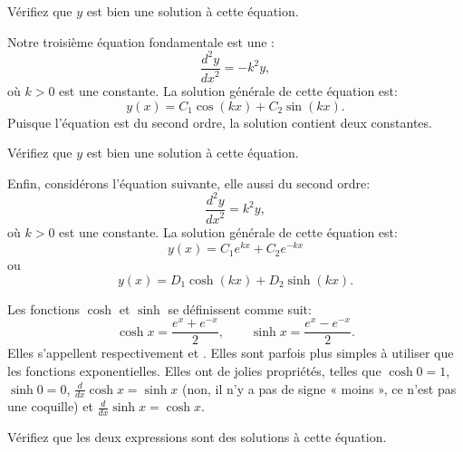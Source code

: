 \begin{exercise}
	Vérifiez que $y$ est bien une solution à cette équation.
\end{exercise}

Notre troisième équation fondamentale est une
\emph{}:
\begin{equation*}
	\frac{d^2y}{{dx}^2} = -k^2 y,
\end{equation*}
où $k > 0$ est une constante. La solution générale de cette équation est:
\begin{equation*}
	y(x) = C_1 \cos(kx) + C_2 \sin(kx).
\end{equation*}
Puisque l'équation est du second ordre, la solution contient deux constantes.

\begin{exercise}
	Vérifiez que $y$ est bien une solution à cette équation.
\end{exercise}

Enfin, considérons l'équation suivante, elle aussi du second ordre:
\begin{equation*}
	\frac{d^2y}{{dx}^2} = k^2 y,
\end{equation*}
où $k > 0$ est une constante. La solution générale de cette équation est:
\begin{equation*}
	y(x) = C_1 e^{kx} + C_2 e^{-kx}
\end{equation*}
ou
\begin{equation*}
	y(x) = D_1 \cosh(kx) + D_2 \sinh(kx) .
\end{equation*}

Les fonctions $\cosh$ et $\sinh$ se définissent comme suit:
\begin{equation*}
	\cosh x = \frac{e^{x} + e^{-x}}{2} , \qquad
	\sinh x = \frac{e^{x} - e^{-x}}{2} .
\end{equation*}
Elles s'appellent respectivement \emph{}
et \emph{}.
Elles sont parfois plus simples à utiliser que les fonctions exponentielles.  Elles ont de jolies propriétés, telles que
$\cosh 0 = 1$, $\sinh 0 = 0$, $\frac{d}{dx} \cosh x = \sinh x$
(non, il n'y a pas de signe « moins », ce n'est pas une coquille)
et $\frac{d}{dx} \sinh x = \cosh x$.

\begin{exercise}
	Vérifiez que les deux expressions sont des solutions à cette équation.
\end{exercise}

